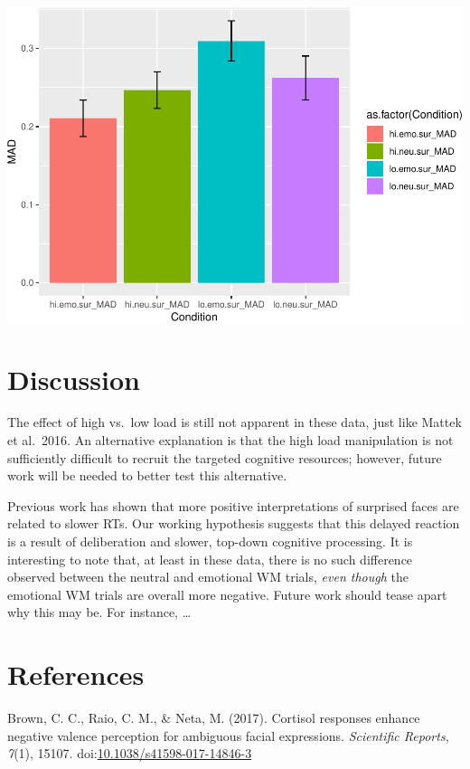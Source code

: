 \documentclass[man]{apa6}
\begin{document}
\includegraphics{Manuscript_files/figure-latex/MAD-1.pdf}

\hypertarget{discussion}{%
\section{Discussion}\label{discussion}}

The effect of high vs.~low load is still not apparent in these data, just like Mattek et al.~2016. An alternative explanation is that the high load manipulation is not sufficiently difficult to recruit the targeted cognitive resources; however, future work will be needed to better test this alternative.

Previous work has shown that more positive interpretations of surprised faces are related to slower RTs. Our working hypothesis suggests that this delayed reaction is a result of deliberation and slower, top-down cognitive processing. It is interesting to note that, at least in these data, there is no such difference observed between the neutral and emotional WM trials, \emph{even though} the emotional WM trials are overall more negative. Future work should tease apart why this may be. For instance, \ldots{}

\newpage

\hypertarget{references}{%
\section{References}\label{references}}

\begingroup
\setlength{\parindent}{-0.5in}
\setlength{\leftskip}{0.5in}

\hypertarget{refs}{}
\leavevmode\hypertarget{ref-brown_cortisol_2017}{}%
Brown, C. C., Raio, C. M., \& Neta, M. (2017). Cortisol responses enhance negative valence perception for ambiguous facial expressions. \emph{Scientific Reports}, \emph{7}(1), 15107. doi:\href{https://doi.org/10.1038/s41598-017-14846-3}{10.1038/s41598-017-14846-3}
\end{document}
